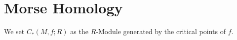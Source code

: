 \section{Morse Homology}

We set $C_*(M, f; R)$ as the $R$-Module generated by the critical points of $f$. 
